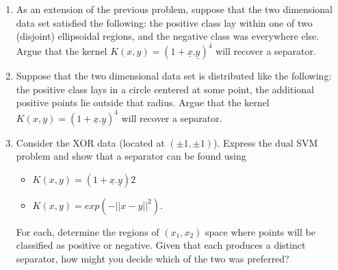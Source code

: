 \documentclass[letter, 12pt]{article}
\begin{document}
\begin{enumerate}
\begin{itemize}
    	\end{itemize}
    	\item{As an extension of the previous problem, suppose that the two dimensional data set satisfied the following: the
    		positive class lay within one of two (disjoint) ellipsoidal regions, and the negative class was everywhere else.
    		Argue that the kernel $ K(x, y) = (1 + \underline{x}.\underline{y})^4 $ will recover a separator.}
    	\item{Suppose that the two dimensional data set is distributed like the following: the positive class lays in a circle centered at some point, the additional positive points lie outside that radius. Argue that the kernel $ K(x, y) = (1 + \underline{x}.\underline{y})^4 $ will recover a separator.}
    	\item{Consider the XOR data (located at $ (\pm1, \pm1) $). Express the dual SVM problem and show that a separator can be found using
    		\begin{itemize}
    			\item{$ K(x, y) = (1 + \underline{x}.\underline{y}) 2 $}
    			\item{$ K(x, y) = exp(-||x - y||^2 ). $}
    	\end{itemize}
    		For each, determine the regions of $ (x_1 , x_2 ) $ space where points will be classified as positive or negative. Given
    		that each produces a distinct separator, how might you decide which of the two was preferred?
    	}
    	
    \end{enumerate}
\end{document}
